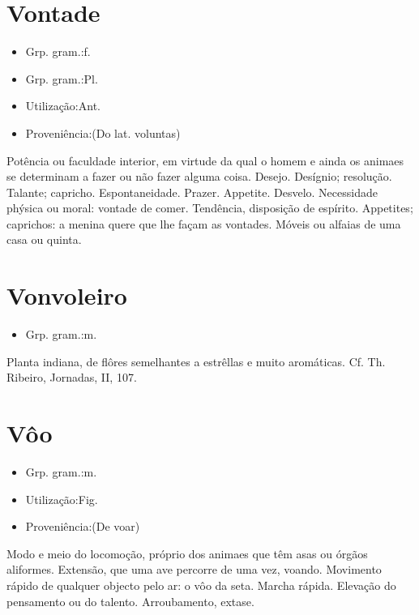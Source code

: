 \documentclass{article}
\begin{document}
\section{Vontade}
\begin{itemize}
\item {Grp. gram.:f.}
\end{itemize}
\begin{itemize}
\item {Grp. gram.:Pl.}
\end{itemize}
\begin{itemize}
\item {Utilização:Ant.}
\end{itemize}
\begin{itemize}
\item {Proveniência:(Do lat. \textunderscore voluntas\textunderscore )}
\end{itemize}
Potência ou faculdade interior, em virtude da qual o homem e ainda os animaes se determinam a fazer ou não fazer alguma coisa.
Desejo.
Desígnio; resolução.
Talante; capricho.
Espontaneidade.
Prazer.
Appetite.
Desvelo.
Necessidade phýsica ou moral: \textunderscore vontade de comer\textunderscore .
Tendência, disposição de espírito.
Appetites; caprichos: \textunderscore a menina quere que lhe façam as vontades\textunderscore .
Móveis ou alfaias de uma casa ou quinta.
\section{Vonvoleiro}
\begin{itemize}
\item {Grp. gram.:m.}
\end{itemize}
Planta indiana, de flôres semelhantes a estrêllas e muito aromáticas. Cf. Th. Ribeiro, \textunderscore Jornadas\textunderscore , II, 107.
\section{Vôo}
\begin{itemize}
\item {Grp. gram.:m.}
\end{itemize}
\begin{itemize}
\item {Utilização:Fig.}
\end{itemize}
\begin{itemize}
\item {Proveniência:(De \textunderscore voar\textunderscore )}
\end{itemize}
Modo e meio do locomoção, próprio dos animaes que têm asas ou órgãos aliformes.
Extensão, que uma ave percorre de uma vez, voando.
Movimento rápido de qualquer objecto pelo ar: \textunderscore o vôo da seta\textunderscore .
Marcha rápida.
Elevação do pensamento ou do talento.
Arroubamento, extase.
\end{document}
